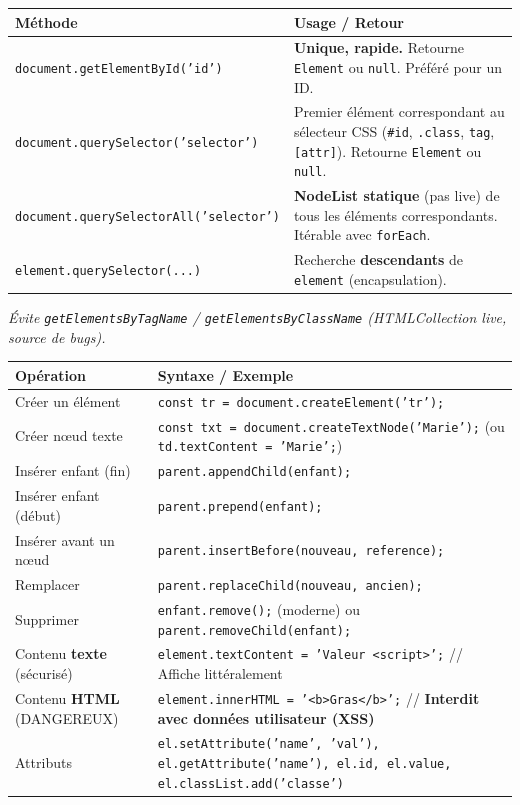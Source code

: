 \documentclass[11pt]{article}
\begin{document}
\begin{propriete}
\begin{center}
\begin{tabularx}{\linewidth}{|l|X|}\hline
\textbf{Méthode} & \textbf{Usage / Retour} \\\hline
\texttt{document.getElementById('id')} & \textbf{Unique, rapide.} Retourne \texttt{Element} ou \texttt{null}. Préféré pour un ID. \\\hline
\texttt{document.querySelector('selector')} & Premier élément correspondant au sélecteur CSS (\texttt{\#id}, \texttt{.class}, \texttt{tag}, \texttt{[attr]}). Retourne \texttt{Element} ou \texttt{null}. \\\hline
\texttt{document.querySelectorAll('selector')} & \textbf{NodeList statique} (pas live) de tous les éléments correspondants. Itérable avec \texttt{forEach}. \\\hline
\texttt{element.querySelector(...)} & Recherche \textbf{descendants} de \texttt{element} (encapsulation). \\\hline
\end{tabularx}
\end{center}
\emph{Évite \texttt{getElementsByTagName} / \texttt{getElementsByClassName} (HTMLCollection \emph{live}, source de bugs).}
\end{propriete}

\begin{propriete}
\begin{center}
\begin{tabularx}{\linewidth}{|l|X|}\hline
\textbf{Opération} & \textbf{Syntaxe / Exemple} \\\hline
Créer un élément & \texttt{const tr = document.createElement('tr');} \\\hline
Créer nœud texte & \texttt{const txt = document.createTextNode('Marie');} (ou \texttt{td.textContent = 'Marie';}) \\\hline
Insérer enfant (fin) & \texttt{parent.appendChild(enfant);} \\\hline
Insérer enfant (début) & \texttt{parent.prepend(enfant);} \\\hline
Insérer avant un nœud & \texttt{parent.insertBefore(nouveau, reference);} \\\hline
Remplacer & \texttt{parent.replaceChild(nouveau, ancien);} \\\hline
Supprimer & \texttt{enfant.remove();} (moderne) ou \texttt{parent.removeChild(enfant);} \\\hline
Contenu \textbf{texte} (sécurisé) & \texttt{element.textContent = 'Valeur <script>';} // Affiche littéralement \\\hline
Contenu \textbf{HTML} (DANGEREUX) & \texttt{element.innerHTML = '<b>Gras</b>';} // \textbf{Interdit avec données utilisateur (XSS)} \\\hline
Attributs & \texttt{el.setAttribute('name', 'val'), el.getAttribute('name'), el.id, el.value, el.classList.add('classe')} \\\hline
\end{tabularx}
\end{center}
\end{propriete}
\end{document}
